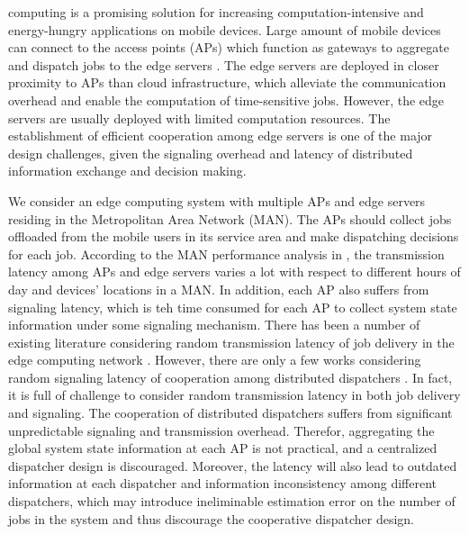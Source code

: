 
 computing is a promising solution for increasing computation-intensive and energy-hungry applications on mobile devices.
Large amount of mobile devices can connect to the access points (APs) which function as gateways to aggregate and dispatch jobs to the edge servers \cite{MEC-SURVEY}.
The edge servers are deployed {in closer proximity} to APs than cloud infrastructure, which alleviate the communication overhead and enable the computation of time-sensitive jobs.
However, the edge servers are usually deployed with limited computation resources.
The establishment of efficient cooperation among edge servers is one of the major design challenges, {given the signaling overhead and latency of distributed information exchange and decision making.}

We consider an edge computing system with multiple APs and edge servers residing in the Metropolitan Area Network (MAN).
The APs should collect jobs offloaded from the mobile users in its service area and make dispatching decisions for each job.
According to the MAN performance analysis in \cite{MAN-LATENCY}, the transmission latency {among APs and edge servers} varies a lot with respect to different hours of day and devices' locations in a MAN.
In addition, each AP also suffers from signaling latency, which is teh time consumed for each AP to collect system state information under some signaling mechanism.
There has been a number of existing literature considering random transmission latency of job delivery in the edge computing network \cite{latency-EDGE19,MOBIHOC19-ZhouZ,IOTJ18-FanQ,TOC19-LiuC,JSAC19-AlameddineHA}.
However, there are only a few works considering random signaling latency of cooperation among distributed dispatchers \cite{tan-online,TWC18-LyuX}.
In fact, it is full of challenge to consider random transmission latency in both job delivery and signaling.
The cooperation of distributed dispatchers suffers from significant unpredictable signaling and transmission overhead.
Therefor, aggregating the global system state information at each AP is not practical, and a centralized dispatcher design is discouraged.
Moreover, the latency will also lead to outdated information at each dispatcher and information inconsistency among different dispatchers, which may introduce ineliminable estimation error on the number of jobs in the system and thus discourage the cooperative dispatcher design.

